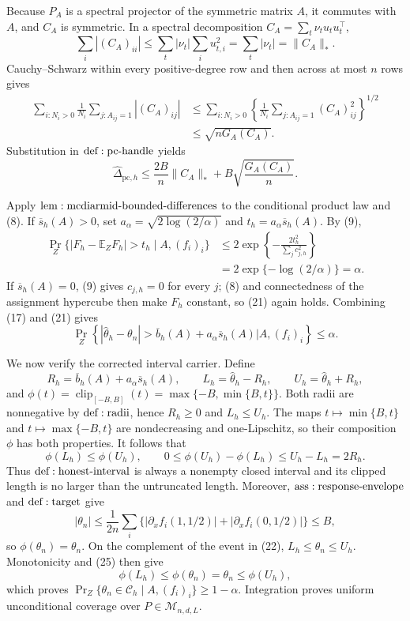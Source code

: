 Because \(P_A\) is a spectral projector of the symmetric matrix \(A\), it commutes with \(A\), and \(C_A\) is symmetric.  In a spectral decomposition \(C_A=\sum_t\nu_tu_tu_t^\top\),
\[
 \sum_i|(C_A)_{ii}|
 \leq\sum_t|\nu_t|\sum_i u_{t,i}^2
 =\sum_t|\nu_t|=\|C_A\|_*.
\tag{18}
\]
Cauchy--Schwarz within every positive-degree row and then across at most \(n\) rows gives
\[
\begin{aligned}
 \sum_{i:N_i>0}\frac1{N_i}\sum_{j:A_{ij}=1}|(C_A)_{ij}|
 &\leq\sum_{i:N_i>0}
 \left\{\frac1{N_i}\sum_{j:A_{ij}=1}(C_A)_{ij}^2\right\}^{1/2}\\
 &\leq\sqrt{nG_A(C_A)}.
\end{aligned}
\tag{19}
\]
Substitution in \({\rm def:pc\text{-}handle}\) yields
\[
 \widehat\Delta_{\mathrm{pc},h}
 \leq\frac{2B}{n}\|C_A\|_*+B\sqrt{\frac{G_A(C_A)}n}.
\tag{20}
\]

Apply \({\rm lem:mcdiarmid\text{-}bounded\text{-}differences}\) to the conditional product law and (8).  If \(\overline s_h(A)>0\), set \(a_\alpha=\sqrt{2\log(2/\alpha)}\) and \(t_h=a_\alpha\overline s_h(A)\).  By (9),
\[
\begin{aligned}
 \Pr_Z\{|F_h-\mathbb E_ZF_h|>t_h\mid A,(f_i)_i\}
 &\leq2\exp\left\{-\frac{2t_h^2}{\sum_jc_{j,h}^2}\right\}\\
 &=2\exp\{-\log(2/\alpha)\}=\alpha.
\end{aligned}
\tag{21}
\]
If \(\overline s_h(A)=0\), (9) gives \(c_{j,h}=0\) for every \(j\); (8) and connectedness of the assignment hypercube then make \(F_h\) constant, so (21) again holds.  Combining (17) and (21) gives
\[
 \Pr_Z\!\left\{
 |\widehat\theta_h-\theta_n|>
 \overline b_h(A)+a_\alpha\overline s_h(A)
 \mathrel{\Big|}A,(f_i)_i\right\}\leq\alpha.
\tag{22}
\]

We now verify the corrected interval carrier.  Define
\[
 R_h=\overline b_h(A)+a_\alpha\overline s_h(A),
 \qquad L_h=\widehat\theta_h-R_h,
 \qquad U_h=\widehat\theta_h+R_h,
\tag{23}
\]
and \(\phi(t)=\operatorname{clip}_{[-B,B]}(t)=\max\{-B,\min\{B,t\}\}\).  Both radii are nonnegative by \({\rm def:radii}\), hence \(R_h\geq0\) and \(L_h\leq U_h\).  The maps \(t\mapsto\min\{B,t\}\) and \(t\mapsto\max\{-B,t\}\) are nondecreasing and one-Lipschitz, so their composition \(\phi\) has both properties.  It follows that
\[
 \phi(L_h)\leq\phi(U_h),
 \qquad
 0\leq\phi(U_h)-\phi(L_h)\leq U_h-L_h=2R_h.
\tag{24}
\]
Thus \({\rm def:honest\text{-}interval}\) is always a nonempty closed interval and its clipped length is no larger than the untruncated length.  Moreover, \({\rm ass:response\text{-}envelope}\) and \({\rm def:target}\) give
\[
 |\theta_n|
 \leq\frac1{2n}\sum_i
 \{|\partial_xf_i(1,1/2)|+|\partial_xf_i(0,1/2)|\}
 \leq B,
\tag{25}
\]
so \(\phi(\theta_n)=\theta_n\).  On the complement of the event in (22), \(L_h\leq\theta_n\leq U_h\).  Monotonicity and (25) then give
\[
 \phi(L_h)\leq\phi(\theta_n)=\theta_n
 \leq\phi(U_h),
\tag{26}
\]
which proves \(\Pr_Z\{\theta_n\in\mathcal C_h\mid A,(f_i)_i\}\geq1-\alpha\).  Integration proves uniform unconditional coverage over \(P\in\mathcal M_{n,d,L}\).

